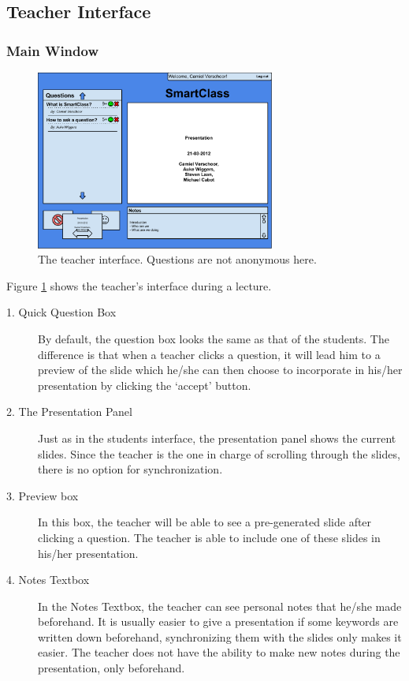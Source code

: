 \documentclass[11pt]{article}
\begin{document}
\subsection{Teacher Interface}
\subsubsection{Main Window}

\begin{figure}[!h]
\centering
\includegraphics[width=0.7\textwidth]{teacherInterface.pdf}
\caption{The teacher interface. Questions are not anonymous here.}
\label{teacherInterface}
\end{figure}

Figure \ref{teacherInterface} shows the teacher's interface during a lecture.
\begin{description}
\item[1. Quick Question Box] By default, the question box looks the same as that of the students. The difference is that when a teacher clicks a question, it will lead him to a preview of the slide which he/she can then choose to incorporate in his/her presentation by clicking the `accept' button. 
\item[2. The Presentation Panel] Just as in the students interface, the presentation panel shows the current slides. Since the teacher is the one in charge of scrolling through the slides, there is no option for synchronization. 
\item[3. Preview box] In this box, the teacher will be able to see a pre-generated slide after clicking a question. The teacher is able to include one of these slides in his/her presentation. 
\item[4. Notes Textbox] In the Notes Textbox, the teacher can see personal notes that he/she made beforehand. It is usually easier to give a presentation if some keywords are written down beforehand, synchronizing them with the slides only makes it easier. The teacher does not have the ability to make new notes during the presentation, only beforehand.
\end{description}
\end{document}
